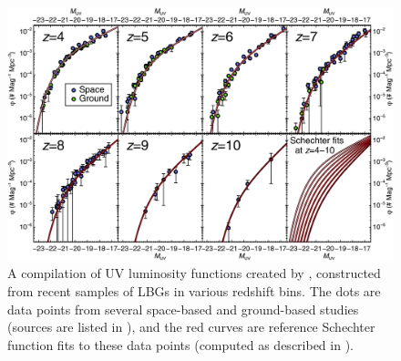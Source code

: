 \begin{figure}[t] 
\centering    
\includegraphics[width=1\textwidth]{Chapter1/Figs/Luminosity_functions.png}
\caption[Luminosity functions at \texorpdfstring{$4<z<10$}{TEXT}]{A compilation of UV luminosity functions created by \cite{2016PASA...33...37F}, constructed from recent samples of LBGs in various redshift bins. The dots are data points from several space-based and ground-based studies (sources are listed in \citealt{2016PASA...33...37F}), and the red curves are reference Schechter function \citep{1976ApJ...203..297S} fits to these data points (computed as described in \citealt{2016PASA...33...37F}).}
\label{fig:luminosity_functions}
\end{figure}


